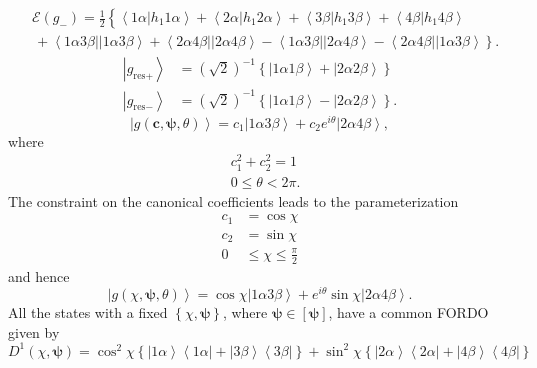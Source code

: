 \documentclass[aps,preprint]{revtex4}%
\begin{document}
\begin{align*}
&  \mathcal{E}\left(  g_{-}\right)  =\frac{1}{2}\left\{  \overset
{}{\left\langle 1\alpha\left\vert h_{1}1\alpha\right.  \right\rangle
+\left\langle 2\alpha\left\vert h_{1}2\alpha\right.  \right\rangle
+\left\langle 3\beta\left\vert h_{1}3\beta\right.  \right\rangle +\left\langle
4\beta\left\vert h_{1}4\beta\right.  \right\rangle }\right.  \\
&  \left.  \,+\left\langle 1\alpha3\beta\right\vert \left\vert 1\alpha
3\beta\right\rangle +\left\langle 2\alpha4\beta\right\vert \left\vert
2\alpha4\beta\right\rangle -\left\langle 1\alpha3\beta\right\vert \left\vert
2\alpha4\beta\right\rangle -\left\langle 2\alpha4\beta\right\vert \left\vert
1\alpha3\beta\right\rangle \overset{}{}\right\}  .
\end{align*}%
\begin{align*}
\left\vert g_{\text{res}+}\right\rangle  &  =\left(  \sqrt{2}\right)
^{-1}\left\{  \left\vert 1\alpha1\beta\right\rangle +\left\vert 2\alpha
2\beta\right\rangle \right\}  \\
\left\vert g_{\text{res}-}\right\rangle  &  =\left(  \sqrt{2}\right)
^{-1}\left\{  \left\vert 1\alpha1\beta\right\rangle -\left\vert 2\alpha
2\beta\right\rangle \right\}  .
\end{align*}%
\[
\left\vert g\left(  \boldsymbol{c},\boldsymbol{\psi},\theta\right)
\right\rangle =c_{1}\left\vert 1\alpha3\beta\right\rangle +c_{2}e^{i\theta
}\left\vert 2\alpha4\beta\right\rangle ,
\]
where
\begin{align*}
&  c_{1}^{2}+c_{2}^{2}=1\\
&  0\leq\theta<2\pi.
\end{align*}
The constraint on the canonical coefficients leads to the parameterization
\begin{align*}
c_{1} &  =\cos\chi\\
c_{2} &  =\sin\chi\\
0 &  \leq\chi\leq\frac{\pi}{2}%
\end{align*}
and hence%
\[
\left\vert g\left(  \chi,\boldsymbol{\psi},\theta\right)  \right\rangle
=\cos\chi\left\vert 1\alpha3\beta\right\rangle +e^{i\theta}\sin\chi\left\vert
2\alpha4\beta\right\rangle .
\]
All the states with a fixed $\left\{  \chi,\boldsymbol{\psi}\right\}  $, where
$\boldsymbol{\psi\in}\left[  \boldsymbol{\psi}\right]  $, have a common FORDO
given by%
\[
D^{1}\left(  \chi,\boldsymbol{\psi}\right)  =\cos^{2}\chi\left\{  \left\vert
1\alpha\right\rangle \left\langle 1\alpha\right\vert +\left\vert
3\beta\right\rangle \left\langle 3\beta\right\vert \right\}  +\sin^{2}%
\chi\left\{  \left\vert 2\alpha\right\rangle \left\langle 2\alpha\right\vert
+\left\vert 4\beta\right\rangle \left\langle 4\beta\right\vert \right\}
\]
\end{document}
